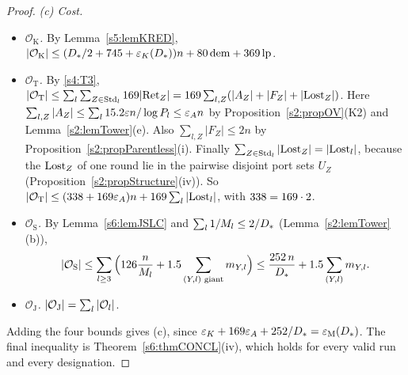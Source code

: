 \begin{proof}
\emph{(c) Cost.}
\begin{itemize}
\item \emph{$\mathcal O_{\mathrm K}$.} By Lemma~\ref{s5:lemKRED}, $|\mathcal O_{\mathrm K}|\le(D_{*}/2+745+\varepsilon_{K}(D_{*}))n+80\,\mathrm{dem}+369\,\mathrm{lp}$.
\item \emph{$\mathcal O_{\mathrm T}$.} By \ref{s4:T3}, $|\mathcal O_{\mathrm T}|\le\sum_l\sum_{Z\in\mathrm{Std}_l}169|\mathrm{Ret}_Z|=169\sum_{l,Z}(|A_Z|+|F_Z|+|\mathrm{Lost}_Z|)$. Here $\sum_{l,Z}|A_Z|\le\sum_l15.2\varepsilon n/\log P_l\le\varepsilon_{A} n$ by Proposition~\ref{s2:propOV}(K2) and Lemma~\ref{s2:lemTower}(e). Also $\sum_{l,Z}|F_Z|\le2n$ by Proposition~\ref{s2:propParentless}(i). Finally $\sum_{Z\in\mathrm{Std}_l}|\mathrm{Lost}_Z|=|\mathrm{Lost}_l|$, because the $\mathrm{Lost}_Z$ of one round lie in the pairwise disjoint port sets $U_Z$ (Proposition~\ref{s2:propStructure}(iv)). So $|\mathcal O_{\mathrm T}|\le(338+169\varepsilon_{A})n+169\sum_l|\mathrm{Lost}_l|$, with $338=169\cdot2$.
\item \emph{$\mathcal O_{\mathrm S}$.} By Lemma~\ref{s6:lemJSLC} and $\sum_l1/M_l\le2/D_{*}$ (Lemma~\ref{s2:lemTower}(b)),
\[
|\mathcal O_{\mathrm S}|\le\sum_{l\ge3}\Big(126\frac n{M_l}+1.5\sum_{(Y,l)\text{ giant}}m_{Y,l}\Big)\le\frac{252\,n}{D_{*}}+1.5\sum_{(Y,l)}m_{Y,l}.
\]
\item \emph{$\mathcal O_{\mathrm J}$.} $|\mathcal O_{\mathrm J}|=\sum_l|\mathcal{O}_l|$.
\end{itemize}
Adding the four bounds gives (c), since $\varepsilon_{K}+169\varepsilon_{A}+252/D_{*}=\varepsilon_{\mathrm M}(D_{*})$. The final inequality is Theorem~\ref{s6:thmCONCL}(iv), which holds for every valid run and every designation.
\end{proof}
